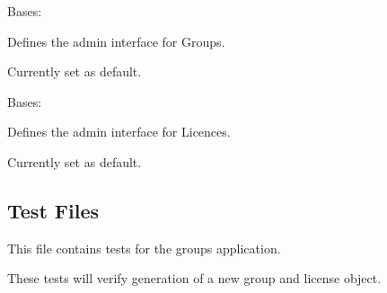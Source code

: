 \documentclass[letterpaper,10pt,english]{sphinxmanual}
\begin{document}
\begin{fulllineitems}
\label{api:mousedb.groups.admin.GroupAdmin}
Bases: 

Defines the admin interface for Groups.

Currently set as default.


\begin{fulllineitems}
\label{api:mousedb.groups.admin.GroupAdmin.media}
\end{fulllineitems}


\end{fulllineitems}



\begin{fulllineitems}
\label{api:mousedb.groups.admin.LicenseAdmin}
Bases: 

Defines the admin interface for Licences.

Currently set as default.


\begin{fulllineitems}
\label{api:mousedb.groups.admin.LicenseAdmin.media}
\end{fulllineitems}


\end{fulllineitems}



\subsection{Test Files}
\label{api:id16}\label{api:module-mousedb.groups.tests}
This file contains tests for the groups application.

These tests will verify generation of a new group and license object.

\end{document}
